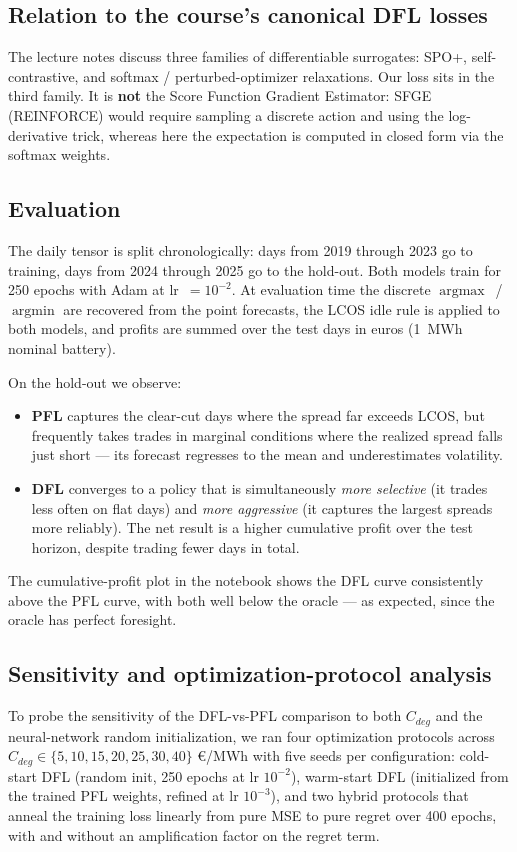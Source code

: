 \documentclass[11pt,a4paper]{article}
\begin{document}
\subsection{Relation to the course's canonical DFL losses}
The lecture notes discuss three families of differentiable surrogates:
SPO+, self-contrastive, and softmax / perturbed-optimizer relaxations.
Our loss sits in the third family. It is \textbf{not} the Score Function
Gradient Estimator: SFGE (REINFORCE) would require sampling a discrete
action and using the log-derivative trick, whereas here the expectation
is computed in closed form via the softmax weights.

\subsection{Evaluation}
The daily tensor is split chronologically: days from 2019 through 2023
go to training, days from 2024 through 2025 go to the hold-out. Both
models train for 250 epochs with Adam at lr~$=10^{-2}$. At evaluation
time the discrete $\operatorname{argmax}$~/~$\operatorname{argmin}$ are
recovered from the point forecasts, the LCOS idle rule is applied to
both models, and profits are summed over the test days in euros (1~MWh
nominal battery).

On the hold-out we observe:

\begin{itemize}[leftmargin=1.5em]
  \item \textbf{PFL} captures the clear-cut days where the spread far
    exceeds LCOS, but frequently takes trades in marginal conditions
    where the realized spread falls just short --- its forecast
    regresses to the mean and underestimates volatility.
  \item \textbf{DFL} converges to a policy that is simultaneously
    \emph{more selective} (it trades less often on flat days) and
    \emph{more aggressive} (it captures the largest spreads more
    reliably). The net result is a higher cumulative profit over the
    test horizon, despite trading fewer days in total.
\end{itemize}

The cumulative-profit plot in the notebook shows the DFL curve
consistently above the PFL curve, with both well below the oracle ---
as expected, since the oracle has perfect foresight.

\subsection{Sensitivity and optimization-protocol analysis}
To probe the sensitivity of the DFL-vs-PFL comparison to both $C_{deg}$ and the neural-network random initialization, we ran four optimization protocols across $C_{deg} \in \{5, 10, 15, 20, 25, 30, 40\}$ \euro/MWh with five seeds per configuration: cold-start DFL (random init, 250 epochs at lr $10^{-2}$), warm-start DFL (initialized from the trained PFL weights, refined at lr $10^{-3}$), and two hybrid protocols that anneal the training loss linearly from pure MSE to pure regret over 400 epochs, with and without an amplification factor on the regret term.
\end{document}
